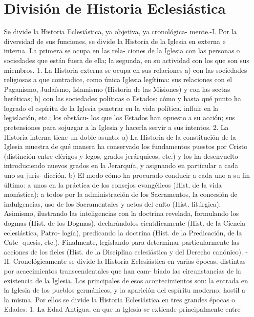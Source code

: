 \raggedbottom{} \documentclass[12pt, a4paper]{book}
\begin{document}
\section{División de Historia Eclesiástica}
Se divide la Historia Eclesiástica, ya objetiva, ya cronológica-
mente.-I. Por la diversidad de sus funciones, se divide la Historia
de la Iglesia en externa e interna. La primera se ocupa en las rela-
ciones de la Iglesia con las personas o sociedades que están fuera de
ella; la segunda, en su actividad con los que son sus miembros.
1. La Historia externa se ocupa en sus relaciones a) con las
sociedades religiosas a que contradice, como única Iglesia legítima:
sus relaciones con el Paganismo, Judaísmo, Islamismo (Historia de las
Misiones) y con las sectas heréticas; b) con las sociedades políticas o
Estados: cómo y hasta qué punto ha logrado el espíritu de la Iglesia
penetrar en la vida política, influir en la legislación, etc.; los obstácu-
los que los Estados han opuesto a su acción; sus pretensiones para
sojuzgar a la Iglesia y hacerla servir a sus intentos.
2. La Historia interna tiene un doble asunto: a) La Historia de
la constitución de la Iglesia muestra de qué manera ha conservado los
fundamentos puestos por Cristo (distinción entre clérigos y legos,
grados jerárquicos, etc.) y los ha desenvuelto introduciendo nuevos
grados en la Jerarquía, y asignando en particular a cada uno su juris-
dicción. b) El modo cómo ha procurado conducir a cada uno a su fin
último: a unos en la práctica de los consejos evangélicos (Hist. de
la vida monástica); a todos por la administración de los Sacramentos,
la concesión de indulgencias, uso de los Sacramentales y actos del
culto (Hist. litúrgica). Asimismo, ilustrando las inteligencias con la
doctrina revelada, formulando los dogmas (Hist. de los Dogmas),
declarándolos científicamente (Hist. de la Ciencia eclesiástica, Patro-
logía), predicando la doctrina (Hist. de la Predicación, de la Cate-
quesis, etc.). Finalmente, legislando para determinar particularmente
las acciones de los fieles (Hist. de la Disciplina eclesiástica y del
Derecho canónico).
- II. Cronológicamente se divide la Historia Eclesiástica en varias
épocas, distintas por acaecimientos transcendentales que han cam-
biado las circunstancias de la existencia de la Iglesia. Los principales
de esos acontecimientos son: la entrada en la Iglesia de los pueblos
germánicos, y la aparición del espíritu moderno, hostil a la misma.
Por ellos se divide la Historia Eclesiástica en tres grandes épocas
o Edades:
1. La Edad Antigua, en que la Iglesia se extiende principalmente entre
\end{document}
